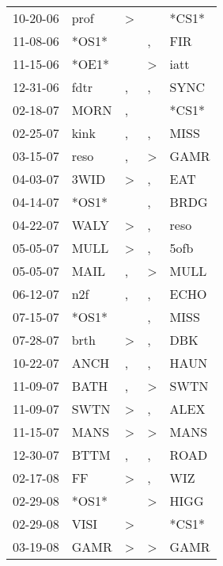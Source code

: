 \begin{supertabular}{lllll}
 10-20-06 &   prof &     \textgreater &                  &  *CS1* \\
 11-08-06 &  *OS1* &                  &                , &    FIR \\
 11-15-06 &  *OE1* &                  &     \textgreater &   iatt \\
 12-31-06 &   fdtr &                , &                , &   SYNC \\
 02-18-07 &   MORN &                , &                  &  *CS1* \\
 02-25-07 &   kink &                , &                , &   MISS \\
 03-15-07 &   reso &                , &     \textgreater &   GAMR \\
 04-03-07 &   3WID &     \textgreater &                , &    EAT \\
 04-14-07 &  *OS1* &                  &                , &   BRDG \\
 04-22-07 &   WALY &     \textgreater &                , &   reso \\
 05-05-07 &   MULL &     \textgreater &                , &   5ofb \\
 05-05-07 &   MAIL &                , &     \textgreater &   MULL \\
 06-12-07 &    n2f &                , &                , &   ECHO \\
 07-15-07 &  *OS1* &                  &                , &   MISS \\
 07-28-07 &   brth &     \textgreater &                , &    DBK \\
 10-22-07 &   ANCH &                , &                , &   HAUN \\
 11-09-07 &   BATH &                , &     \textgreater &   SWTN \\
 11-09-07 &   SWTN &     \textgreater &                , &   ALEX \\
 11-15-07 &   MANS &     \textgreater &     \textgreater &   MANS \\
 12-30-07 &   BTTM &                , &                , &   ROAD \\
 02-17-08 &     FF &     \textgreater &                , &    WIZ \\
 02-29-08 &  *OS1* &                  &     \textgreater &   HIGG \\
 02-29-08 &   VISI &     \textgreater &                  &  *CS1* \\
 03-19-08 &   GAMR &     \textgreater &     \textgreater &   GAMR \\

\end{supertabular}
